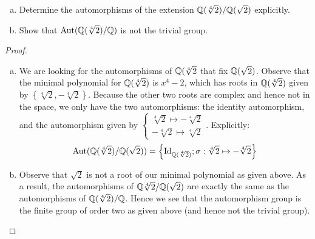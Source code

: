 \documentclass[num=10,duedate=04-14-21,course=Algebra\ II,proflastname=Walton]{hwtemplate}
\begin{document}
\problem[2]
\begin{claim}
	\begin{enumerate}[(a).]
		\item Determine the automorphisms of the extension \(\mathbb{Q}(\sqrt[4]{2}) / \mathbb{Q}(\sqrt{2} ) \) explicitly.
		\item Show that \(\textrm{Aut}(\mathbb{Q}(\sqrt[4]{2}) / \mathbb{Q}) \) is not the trivial group.
	\end{enumerate}
\end{claim}
\begin{proof}
	\begin{enumerate}[(a).]
		\item We are looking for the automorphisms of \(\mathbb{Q}(\sqrt[4]{2} \) that fix \(\mathbb{Q}(\sqrt{2} )\). Observe that the minimal polynomial for \(\mathbb{Q}(\sqrt[4]{2}) \) is \(x^{4}-2\), which has roots in \(\mathbb{Q}(\sqrt[4]{2}) \) given by \(\left\{ \sqrt[4]{2}, - \sqrt[4]{2}   \right\} \). Because the other two roots are complex and hence not in the space, we only have the two automorphisms: the identity automorphism, and the automorphism given by \(\begin{cases}
				\sqrt[4]{2} \mapsto -\sqrt[4]{2} \\
				-\sqrt[4]{2} \mapsto \sqrt[4]{2}  
		\end{cases}\). Explicitly:
		\begin{align*}
			\textrm{Aut}(\mathbb{Q}(\sqrt[4]{2}) / \mathbb{Q}(\sqrt{2} )) = \left\{ \textrm{Id}_{\mathbb{Q}(\sqrt[4]{2}) }; \sigma: \sqrt[4]{2}\mapsto -\sqrt[4]{2}   \right\} 
		\end{align*}
	\item Observe that \(\sqrt{2} \) is not a root of our minimal polynomial as given above. As a result, the automorphisms of \(\mathbb{Q}\sqrt[4]{2} / \mathbb{Q}(\sqrt{2} ) \) are exactly the same as the automorphisms of \(\mathbb{Q}(\sqrt[4]{2})/ \mathbb{Q}\). Hence we see that the automorphism group is the finite group of order two as given above (and hence not the trivial group).
	\end{enumerate}
\end{proof}
\end{document}
